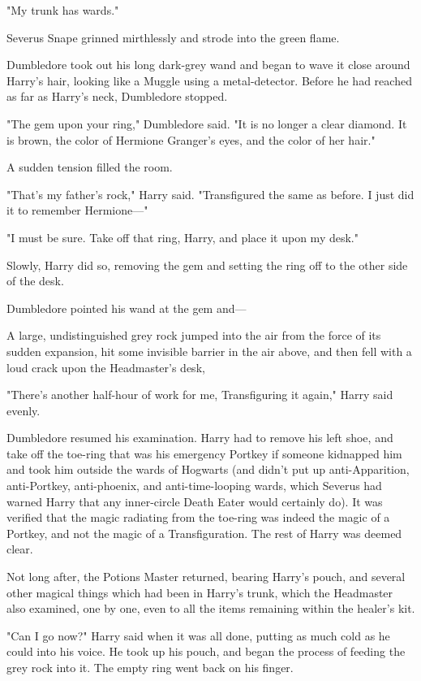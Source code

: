 "My trunk has wards."

Severus Snape grinned mirthlessly and strode into the green flame.

Dumbledore took out his long dark-grey wand and began to wave it close around
Harry's hair, looking like a Muggle using a metal-detector. Before he had
reached as far as Harry's neck, Dumbledore stopped.

"The gem upon your ring," Dumbledore said. "It is no longer a clear diamond. It
is brown, the color of Hermione Granger's eyes, and the color of her hair."

A sudden tension filled the room.

"That's my father's rock," Harry said. "Transfigured the same as before. I just
did it to remember Hermione---"

"I must be sure. Take off that ring, Harry, and place it upon my desk."

Slowly, Harry did so, removing the gem and setting the ring off to the other
side of the desk.

Dumbledore pointed his wand at the gem and---

A large, undistinguished grey rock jumped into the air from the force of its
sudden expansion, hit some invisible barrier in the air above, and then fell
with a loud crack upon the Headmaster's desk,

"There's another half-hour of work for me, Transfiguring it again," Harry said
evenly.

Dumbledore resumed his examination. Harry had to remove his left shoe, and take
off the toe-ring that was his emergency Portkey if someone kidnapped him and
took him outside the wards of Hogwarts (and didn't put up anti-Apparition,
anti-Portkey, anti-phoenix, and anti-time-looping wards, which Severus had
warned Harry that any inner-circle Death Eater would certainly do). It was
verified that the magic radiating from the toe-ring was indeed the magic of a
Portkey, and not the magic of a Transfiguration. The rest of Harry was deemed
clear.

Not long after, the Potions Master returned, bearing Harry's pouch, and several
other magical things which had been in Harry's trunk, which the Headmaster also
examined, one by one, even to all the items remaining within the healer's kit.

"Can I go now?" Harry said when it was all done, putting as much cold as he
could into his voice. He took up his pouch, and began the process of feeding
the grey rock into it. The empty ring went back on his finger.

